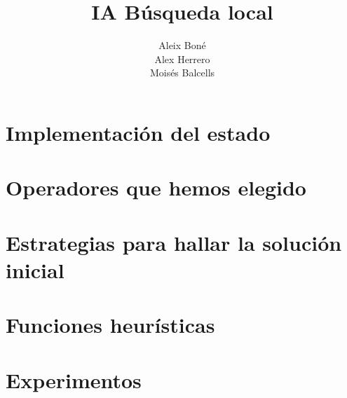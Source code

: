 

\title{IA Búsqueda local}
\author{%
    Aleix Boné\\
    Alex Herrero\\
    Moisés Balcells\\
}
\date{%
}


 
\maketitle



\section{Implementación del estado}

\section{Operadores que hemos elegido}

\section{Estrategias para hallar la solución inicial}

\section{Funciones heurísticas}

\section{Experimentos}

